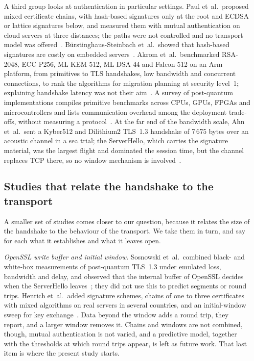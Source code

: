 \documentclass[preprint,12pt]{elsarticle}
\begin{document}
A third group looks at authentication in particular settings. Paul et~al.\ proposed mixed certificate chains, with hash-based signatures only at the root and ECDSA or lattice signatures below, and measured them with mutual authentication on cloud servers at three distances; the paths were not controlled and no transport model was offered~\cite{paul2022}. B{\"u}rstinghaus-Steinbach et~al.\ showed that hash-based signatures are costly on embedded servers~\cite{burstinghaus2020}. Akrom et~al.\ benchmarked RSA-2048, ECC-P256, ML-KEM-512, ML-DSA-44 and Falcon-512 on an Arm platform, from primitives to TLS handshakes, low bandwidth and concurrent connections, to rank the algorithms for migration planning at security level~1; explaining handshake latency was not their aim~\cite{akrom2027}. A survey of post-quantum implementations compiles primitive benchmarks across CPUs, GPUs, FPGAs and microcontrollers and lists communication overhead among the deployment trade-offs, without measuring a protocol~\cite{sakwa2026}. At the far end of the bandwidth scale, Ahn et~al.\ sent a Kyber512 and Dilithium2 TLS~1.3 handshake of 7\,675 bytes over an acoustic channel in a sea trial; the ServerHello, which carries the signature material, was the largest flight and dominated the session time, but the channel replaces TCP there, so no window mechanism is involved~\cite{ahn2026}.

\subsection{Studies that relate the handshake to the transport}
\label{sec:related-near}
A smaller set of studies comes closer to our question, because it relates the size of the handshake to the behaviour of the transport. We take them in turn, and say for each what it establishes and what it leaves open.

\emph{OpenSSL write buffer and initial window.} Sosnowski et~al.\ combined black- and white-box measurements of post-quantum TLS~1.3 under emulated loss, bandwidth and delay, and observed that the internal buffer of OpenSSL decides when the ServerHello leaves~\cite{sosnowski2023}; they did not use this to predict segments or round trips. Henrich et~al.\ added signature schemes, chains of one to three certificates with mixed algorithms on real servers in several countries, and an initial-window sweep for key exchange~\cite{henrich2025}. Data beyond the window adds a round trip, they report, and a larger window removes it. Chains and windows are not combined, though, mutual authentication is not varied, and a predictive model, together with the thresholds at which round trips appear, is left as future work. That last item is where the present study starts.
\end{document}
